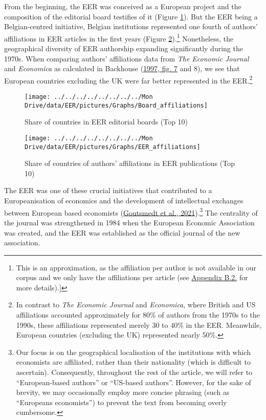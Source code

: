 \documentclass[
  12pt,
  onecolumn]{article}
\begin{document}
From the beginning, the EER was conceived as a European project and the
composition of the editorial board testifies of it (Figure
\ref{fig:plot-boards}). But the EER being a Belgian-centred initiative,
Belgian institutions represented one fourth of authors' affiliations in
EER articles in the first years (Figure
\ref{fig:plot-authors}).\footnote{This is an approximation, as the
  affiliation per author is not available in our corpus and we only have
  the affiliations per article (see
  \protect\hyperlink{author-affiliation}{Appendix B.2.} for more
  details).{]}} Nonetheless, the geographical diversity of EER
authorship expanding significantly during the 1970s. When comparing
authors' affiliations data from \emph{The Economic Journal} and
\emph{Economica} as calculated in Backhouse
(\protect\hyperlink{ref-backhouse1997a}{1997, fig. 7} and 8), we see
that European countries excluding the UK were far better represented in
the EER.\footnote{In contrast to \emph{The Economic Journal} and
  \emph{Economica}, where British and US affiliations accounted
  approximately for 80\% of authors from the 1970s to the 1990s, these
  affiliations represented merely 30 to 40\% in the EER. Meanwhile,
  European countries (excluding the UK) represented nearly 50\%.}

\begin{figure}[h]

{\centering \texttt{[image: ../../../../../../../../Mon Drive/data/EER/pictures/Graphs/Board\_affiliations]} 

}

\caption{Share of countries in EER editorial boards (Top 10)}\label{fig:plot-boards}
\end{figure}

\begin{figure}[h]

{\centering \texttt{[image: ../../../../../../../../Mon Drive/data/EER/pictures/Graphs/EER\_affiliations]} 

}

\caption{Share of countries of authors' affiliations in EER publications (Top 10)}\label{fig:plot-authors}
\end{figure}

The EER was one of these crucial initiatives that contributed to a
Europeanisation of economics and the development of intellectual
exchanges between European based economists
(\protect\hyperlink{ref-goutsmedt2021}{Goutsmedt et al.,
2021}).\footnote{Our focus is on the geographical localisation of the
  institutions with which economists are affiliated, rather than their
  nationality (which is difficult to ascertain). Consequently,
  throughout the rest of the article, we will refer to ``European-based
  authors'' or ``US-based authors''. However, for the sake of brevity,
  we may occasionally employ more concise phrasing (such as ``Europeans
  economists'') to prevent the text from becoming overly cumbersome.}
The centrality of the journal was strengthened in 1984 when the European
Economic Association was created, and the EER was established as the
official journal of the new association.
\end{document}
